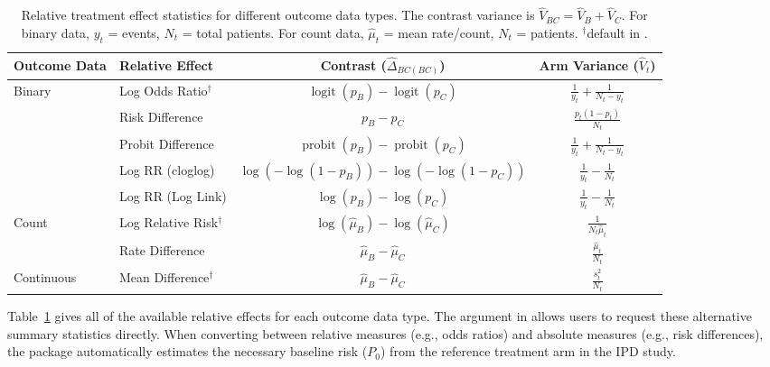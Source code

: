 \documentclass[article]{jss}
\begin{document}
\begin{table}[!ht]
    \centering
    \renewcommand{\arraystretch}{2.2}
    \begin{tabular}{@{} l l c c @{}}
        \toprule
        \textbf{Outcome Data} & \textbf{Relative Effect} & \textbf{Contrast ($\widehat{\Delta}_{BC(BC)}$)} & \textbf{Arm Variance ($\widehat{V}_t$)} \\
        \midrule
        Binary 
          & Log Odds Ratio$^\dagger$ & $\operatorname{logit}(p_B) - \operatorname{logit}(p_C)$ & $\frac{1}{y_t} + \frac{1}{N_t - y_t}$ \\
          & Risk Difference & $p_B - p_C$ & $\frac{p_t(1 - p_t)}{N_t}$ \\
          & Probit Difference & $\operatorname{probit}(p_B) - \operatorname{probit}(p_C)$ & $\frac{1}{y_t} + \frac{1}{N_t - y_t}$ \\
          & Log RR (cloglog) & $\log(-\log(1 - p_B)) - \log(-\log(1 - p_C))$ & $\frac{1}{y_t} - \frac{1}{N_t}$ \\
          & Log RR (Log Link) & $\log(p_B) - \log(p_C)$ & $\frac{1}{y_t} - \frac{1}{N_t}$ \\
        Count 
          & Log Relative Risk$^\dagger$ & $\log(\hat{\mu}_B) - \log(\hat{\mu}_C)$ & $\frac{1}{N_t \hat{\mu}_t}$ \\
          & Rate Difference & $\hat{\mu}_B - \hat{\mu}_C$ & $\frac{\hat{\mu}_t}{N_t}$ \\
        Continuous 
          & Mean Difference$^\dagger$ & $\hat{\mu}_B - \hat{\mu}_C$ & $\frac{s_t^2}{N_t}$ \\
        \bottomrule
    \end{tabular}
    \caption{Relative treatment effect statistics for different outcome data types. The contrast variance is $\widehat{V}_{BC} = \widehat{V}_B + \widehat{V}_C$. For binary data, $y_t$ = events, $N_t$ = total patients. For count data, $\hat{\mu}_t$ = mean rate/count, $N_t$ = patients. $^\dagger$default in .}
        \label{tab:releff}
\end{table}

Table~\ref{tab:releff} gives all of the available relative effects for each outcome data type. The  argument in  allows users to request these alternative summary statistics directly. 
When converting between relative measures (e.g., odds ratios) and absolute measures (e.g., risk differences), the package automatically estimates the necessary baseline risk ($P_0$) from the reference treatment arm in the IPD study.
\end{document}
